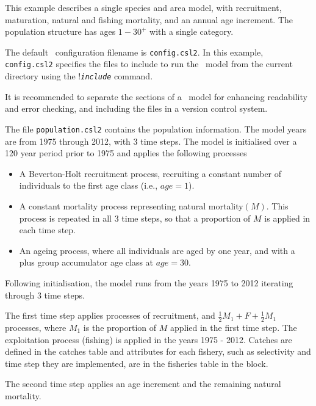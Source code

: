 This example describes a single species and area model, with recruitment, maturation, natural and fishing mortality, and an annual age increment. The population structure has ages $1-30^{+}$ with a single category.

The default \CNAME\ configuration filename is \texttt{config.csl2}. In this example, \texttt{config.csl2} specifies the files to include to run the \CNAME\ model from the current directory using the !\texttt{\emph{include}} command.



It is recommended to separate the sections of a \CNAME\ model for enhancing readability and error checking, and including the files in a version control system.

The file  \texttt{population.csl2} contains the population information. The model years are from 1975 through 2012, with 3 time steps. The model is initialised over a 120 year period prior to 1975 and applies the following processes

\begin{itemize}
\item A Beverton-Holt recruitment process, recruiting a constant number of individuals to the first age class (i.e., $age=1$).

\item A constant mortality process representing natural mortality$(M)$. This process is repeated in all 3 time steps, so that a proportion of $M$ is applied in each time step.

\item An ageing process, where all individuals are aged by one year, and with a plus group accumulator age class at $age=30$.
\end{itemize}

Following initialisation, the model runs from the years 1975 to 2012 iterating through 3 time steps.

The first time step applies processes of recruitment, and  $\frac{1}{2} M_1 + F + \frac{1}{2} M_1$ processes, where $M_1$ is the proportion of $M$ applied in the first time step. The exploitation process (fishing) is applied in the years 1975 - 2012. Catches are defined in the catches table and attributes for each fishery, such as selectivity and time step they are implemented, are in the fisheries table in the  block.

The second time step applies an age increment and the remaining natural mortality.

